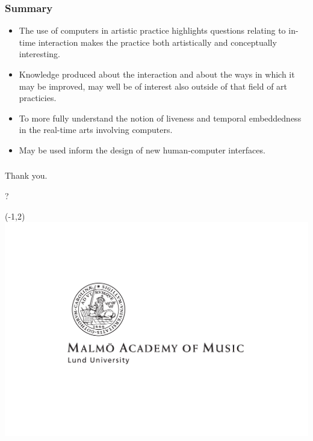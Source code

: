 \documentclass{beamer}
\begin{document}
\begin{frame}
  \frametitle{Summary}
  \pause[2]
  \begin{block}{}
    \begin{itemize}
    \item<2-> The use of computers in artistic practice highlights questions
      relating to in-time interaction makes the practice both artistically and
      conceptually interesting.
    \item<3-> Knowledge produced about the interaction and about the ways in
      which it may be improved, may well be of interest also outside of that
      field of art practicies.
    \end{itemize}
  \end{block}
  \pause[4]
  \begin{block}{}
    \begin{itemize}
    \item<4-> To more fully understand the notion of liveness and temporal
      embeddedness in the real-time arts involving computers.
    \item<5-> May be used inform the design of new human-computer interfaces.
    \end{itemize}
  \end{block}
\end{frame}

\begin{frame}
   \frametitle{}
   \begin{block}{Thank you.}
     \begin{center}
       \huge{?}
     \end{center}
   \end{block}
   \begin{textblock}{7}(-1,2)
     \includegraphics[width=\textwidth]{img/mhm-logo}
   \end{textblock}
\end{frame}
\end{document}
